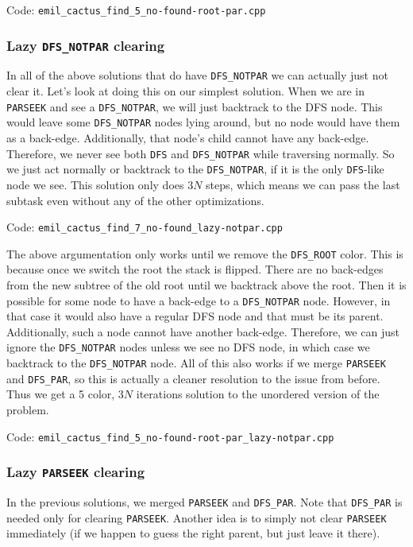 \documentclass{article}
\begin{document}
Code: \verb|emil_cactus_find_5_no-found-root-par.cpp|

\subsubsection{Lazy \texttt{DFS\_NOTPAR} clearing}

In all of the above solutions that do have \verb|DFS_NOTPAR| we can actually just not clear it. Let's look at doing this on our simplest solution. When we are in \verb|PARSEEK| and see a \verb|DFS_NOTPAR|, we will just backtrack to the DFS node. This would leave some \verb|DFS_NOTPAR| nodes lying around, but no node would have them as a back-edge. Additionally, that node's child cannot have any back-edge. Therefore, we never see both \verb|DFS| and \verb|DFS_NOTPAR| while traversing normally. So we just act normally or backtrack to the \verb|DFS_NOTPAR|, if it is the only \verb|DFS|-like node we see. This solution only does $3N$ steps, which means we can pass the last subtask even without any of the other optimizations.

Code: \verb|emil_cactus_find_7_no-found_lazy-notpar.cpp|

The above argumentation only works until we remove the \verb|DFS_ROOT| color. This is because once we switch the root the stack is flipped. There are no back-edges from the new subtree of the old root until we backtrack above the root. Then it is possible for some node to have a back-edge to a \verb|DFS_NOTPAR| node. However, in that case it would also have a regular DFS node and that must be its parent. Additionally, such a node cannot have another back-edge. Therefore, we can just ignore the \verb|DFS_NOTPAR| nodes unless we see no DFS node, in which case we backtrack to the \verb|DFS_NOTPAR| node. All of this also works if we merge \verb|PARSEEK| and \verb|DFS_PAR|, so this is actually a cleaner resolution to the issue from before. Thus we get a 5 color, $3N$ iterations solution to the unordered version of the problem.

Code: \verb|emil_cactus_find_5_no-found-root-par_lazy-notpar.cpp|

\subsubsection{Lazy \texttt{PARSEEK} clearing}

In the previous solutions, we merged \verb|PARSEEK| and \verb|DFS_PAR|. Note that \verb|DFS_PAR| is needed only for clearing \verb|PARSEEK|. Another idea is to simply not clear \verb|PARSEEK| immediately (if we happen to guess the right parent, but just leave it there).
\end{document}
